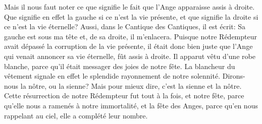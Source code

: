 Mais il nous faut noter
	ce que signifie le fait que l’Ange apparaisse assis à droite.
Que signifie en effet la gauche si ce n’est la vie présente,
	et que signifie la droite si ce n’est la vie éternelle?
Aussi, dans le Cantique des Cantiques, il est écrit:
	Sa gauche est sous ma tête et, de sa droite, il m’enlacera.
Puisque notre Rédempteur avait dépassé la corruption de la vie présente,
	il était donc bien juste que l’Ange qui venait annoncer sa vie éternelle,
	fût assis à droite.
Il apparut vêtu d’une robe blanche,
	parce qu’il était messager des joies de notre fête.
La blancheur du vêtement signale en effet
		le splendide rayonnement de notre solennité.
Dirons-nous la nôtre, ou la sienne?
	Mais pour mieux dire, c’est la sienne et la nôtre.
Cette résurrection de notre Rédempteur fut tout à la fois,
	et notre fête, parce qu’elle nous a ramenés à notre immortalité,
	et la fête des Anges, parce qu’en nous rappelant au ciel,
		elle a complété leur nombre.
